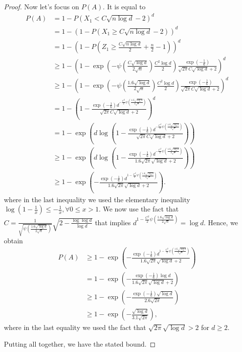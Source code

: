 \documentclass{article}
\begin{document}
\begin{proof}
Now let's focus on $P(A)$. It is equal to
\begin{align*}
P(A)
&= 1-P(X_1 < C \sqrt{n \log d}-2)^d \\
&= 1-(1-P(X_1\geq C \sqrt{n \log d}-2))^d \\
&= 1-(1-P(Z_1\geq \frac{C \sqrt{n \log d}}{2} +\frac{n}{2}-1))^d \\
&\geq 1-\left(1-\exp\left(- \psi\left(\frac{C \sqrt{\log d}}{2 \sqrt{n}}\right) \frac{C^2 \log d}{2}\right) \frac{\exp\left(-\frac{1}{6}\right)}{\sqrt{2\pi}C \sqrt{\log d}+2}\right)^d \\
&\geq 1-\left(1-\exp\left(- \psi\left(\frac{1.6 \sqrt{\log d}}{2 \sqrt{n}}\right) \frac{C^2 \log d}{2}\right) \frac{\exp\left(-\frac{1}{6}\right)}{\sqrt{2\pi}C \sqrt{\log d}+2}\right)^d \\
&= 1-\left(1-\frac{\exp\left(-\frac{1}{6}\right) d^{-\frac{C^2}{2} \psi\left(\frac{1.6 \sqrt{\log d}}{2 \sqrt{n}}\right)}}{\sqrt{2\pi}C \sqrt{\log d}+2}\right)^d \\
&= 1- \exp\left(d \log\left(1-\frac{\exp\left(-\frac{1}{6}\right) d^{-\frac{C^2}{2} \psi\left(\frac{1.6 \sqrt{\log d}}{2 \sqrt{n}}\right)}}{\sqrt{2\pi}C \sqrt{\log d}+2}\right)\right) \\
&\geq 1- \exp\left(d \log\left(1-\frac{\exp\left(-\frac{1}{6}\right) d^{-\frac{C^2}{2} \psi\left(\frac{1.6 \sqrt{\log d}}{2 \sqrt{n}}\right)}}{1.6 \sqrt{2\pi} \sqrt{\log d}+2}\right)\right) \\
&\geq 1 - \exp\left(-\frac{\exp\left(-\frac{1}{6}\right) d^{1-\frac{C^2}{2} \psi\left(\frac{1.6 \sqrt{\log d}}{2 \sqrt{n}}\right)}}{1.6 \sqrt{2\pi} \sqrt{\log d}+2}\right).
\end{align*}
where in the last inequality we used the elementary inequality $\log(1-\frac{1}{x}) \leq -\frac{1}{x}, \forall  0\leq x>1$.
We now use the fact that $C=\frac{1}{\sqrt{\psi\left(\frac{1.6 \sqrt{\log d}}{2 \sqrt{n}}\right)}}\sqrt{2- \frac{\log \log d}{\log d}}$ that implies $d^{1-\frac{C^2}{2} \psi\left(\frac{1.6 \sqrt{\log d}}{2 \sqrt{n}}\right)}=\log d$. Hence, we obtain
\begin{align*}
P(A)
& \geq 1 - \exp\left(-\frac{\exp\left(-\frac{1}{6}\right) d^{1-\frac{C^2}{2} \psi\left(\frac{1.6 \sqrt{\log d}}{2 \sqrt{n}}\right)}}{1.6 \sqrt{2\pi} \sqrt{\log d}+2}\right) \\
& = 1 - \exp\left(-\frac{\exp\left(-\frac{1}{6}\right) \log d}{1.6 \sqrt{2\pi} \sqrt{\log d}+2}\right) \\
& \geq 1 - \exp\left(-\frac{\exp\left(-\frac{1}{6}\right) \sqrt{\log d}}{2.6 \sqrt{2\pi}}\right)\\
& \geq 1 - \exp\left(-\frac{\sqrt{\log d}}{3.1 \sqrt{2\pi}}\right),
\end{align*}
where in the last equality we used the fact that $\sqrt{2\pi} \sqrt{\log d} > 2$ for $d\geq 2$.

Putting all together, we have the stated bound.
\end{proof}
\end{document}
